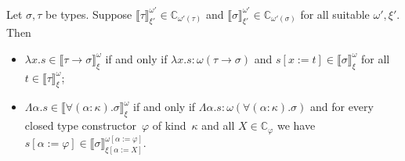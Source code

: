 \documentclass[a4paper,UKenglish,cleveref,autoref,numberwithinsect]{lipics-v2019}
\theoremstyle{definition}
\newcommand{\arrtype}{\rightarrow}
\newcommand{\quant}[2]{\forall #1.#2}
\newcommand{\subst}[2]{#1:=#2}
\newcommand{\abs}[2]{\lambda #1.#2}
\newcommand{\tabs}[2]{\Lambda #1.#2}
\newcommand{\Cb}{\mathbb{C}}
\newcommand{\val}[3]{\ensuremath{\llbracket#1\rrbracket_{#2}^{#3}}}
\begin{document}
\begin{lemma}\label{lem_abstraction_computable}
  Let $\sigma,\tau$ be types. Suppose $\val{\tau}{\xi'}{\omega'} \in
  \Cb_{\omega'(\tau)}$ and $\val{\sigma}{\xi'}{\omega'} \in
  \Cb_{\omega'(\sigma)}$ for all suitable $\omega',\xi'$. Then
  \begin{itemize}
  \item
    $\abs{x}{s} \in \val{\tau \arrtype \sigma}{\xi}{\omega}$ if and
    only if $\abs{x}{s} : \omega(\tau \arrtype \sigma)$ and $s[x:=t]
    \in \val{\sigma}{\xi}{\omega}$ for all $t \in
    \val{\tau}{\xi}{\omega}$;
  \item
    $\tabs{\alpha}{s} \in
    \val{\quant{(\alpha:\kappa)}{\sigma}}{\xi}{\omega}$ if and only if
    $\tabs{\alpha}{s} : \omega(\quant{(\alpha:\kappa)}{\sigma})$ and
    for every closed type constructor~$\varphi$ of kind~$\kappa$ and
    all $X \in \Cb_\varphi$ we have $s[\alpha:=\varphi] \in
    \val{\sigma}{\xi[\subst{\alpha}{X}]}{\omega[\subst{\alpha}{\varphi}]}$.
  \end{itemize}
\end{lemma}
\end{document}
